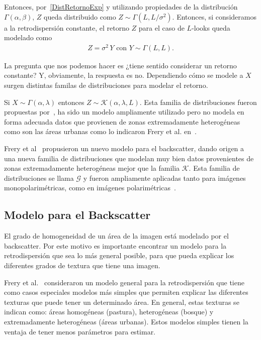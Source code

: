 Entonces, por~\ref{DistRetornoExp} y utilizando propiedades de la distribución $\Gamma(\alpha,\beta)$, $Z$  queda distribuido como $Z \sim \Gamma(L,L/\sigma^2)$. Entonces, si consideramos a la retrodispersión constante, el retorno $Z$ para el caso de $L$-looks queda modelado como
\begin{align}
Z=\sigma^2 \, Y \text{ con } Y \sim \Gamma(L,L).
\end{align}

La pregunta que nos podemos hacer es ¿tiene sentido considerar un retorno constante? Y, obviamente, la respuesta es no. Dependiendo cómo se modele a $X$ surgen distintas familas de distribuciones para modelar el retorno.

Si $X \sim \Gamma(\alpha,\lambda)$ entonces $Z \sim \mathcal{K}(\alpha,\lambda,L)$. Esta familia de distribuciones fueron propuestas por~\cite{Jakeman87}, ha sido un modelo ampliamente utilizado pero no modela en forma adecuada datos que provienen de zonas extremadamente heterogéneas como son las áreas urbanas como lo indicaron Frery et al. en~\cite{Frery97}.

Frery et al~\cite{Frery99} propusieron un nuevo modelo para el backscatter, dando origen a una nueva familia de distribuciones que modelan muy bien datos provenientes de zonas extremadamente heterogéneas mejor que la familia $\mathcal{K}$. Esta familia de distribuciones se llama $\mathcal{G}$ y fueron ampliamente aplicadas tanto para imágenes monopolarimétricas\cite{gambini2015,Nascimento2009}, como en imágenes polarimétricas~\cite{Freitas2005,Palacio2019}.

\subsection{Modelo para el Backscatter}
\label{ModeloBackscatter}

El grado de homogeneidad de un área de la imagen está modelado por el backscatter. Por este motivo es importante encontrar un modelo para la retrodispersión que sea lo más general posible, para que pueda explicar los diferentes grados de textura que tiene una imagen.

Frery et al.~\cite{Frery99} consideraron un modelo general para la retrodispersión que tiene como casos especiales modelos más simples que permiten explicar las diferentes texturas que puede tener un determinado área. En general, estas texturas se indican como: áreas homogéneas (pastura), heterogéneas (bosque) y extremadamente heterogéneas (áreas urbanas). Estos modelos simples tienen la ventaja de tener menos parámetros para estimar.

